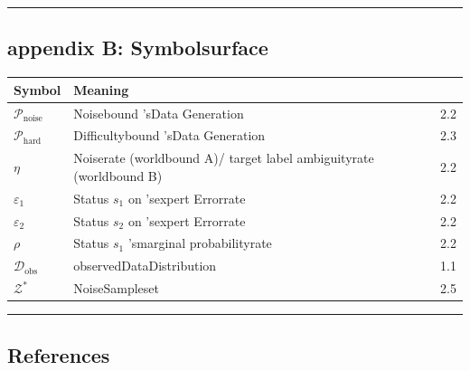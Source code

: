 \documentclass[
  12pt,
]{article}
\begin{document}
\begin{center}\rule{0.5\linewidth}{0.5pt}\end{center}

\subsection{appendix B: Symbolsurface}\label{ux9644ux5f55-bux7b26ux53f7ux8868}

\begin{longtable}[]{@{}lll@{}}
\toprule\noalign{}
Symbol & Meaning &  \\
\midrule\noalign{}
\endhead
\bottomrule\noalign{}
\endlastfoot
\(\mathcal{P}_{\text{noise}}\) & Noisebound 'sData Generation & 2.2 \\
\(\mathcal{P}_{\text{hard}}\) & Difficultybound 'sData Generation & 2.3 \\
\(\eta\) & Noiserate (worldbound  A)/ target label ambiguityrate (worldbound  B) & 2.2 \\
\(\varepsilon_1\) & Status \(s_1\) on 'sexpert Errorrate  & 2.2 \\
\(\varepsilon_2\) & Status \(s_2\) on 'sexpert Errorrate  & 2.2 \\
\(\rho\) & Status \(s_1\) 'smarginal probabilityrate  & 2.2 \\
\(\mathcal{D}_{\text{obs}}\) & observedDataDistribution & 1.1 \\
\(\mathcal{Z}^*\) & NoiseSampleset  & 2.5 \\
\end{longtable}

\begin{center}\rule{0.5\linewidth}{0.5pt}\end{center}

\subsection{References}\label{ux53c2ux8003ux6587ux732e}
\end{document}
